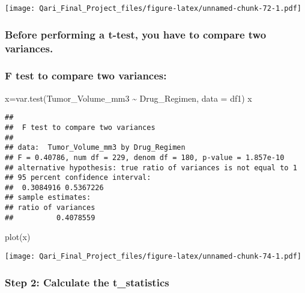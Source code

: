 \documentclass[
]{article}
\newenvironment{Shaded}{\begin{snugshade}}{\end{snugshade}}
\newcommand{\AttributeTok}[1]{\textcolor[rgb]{0.77,0.63,0.00}{#1}}
\newcommand{\FunctionTok}[1]{\textcolor[rgb]{0.00,0.00,0.00}{#1}}
\newcommand{\NormalTok}[1]{#1}
\newcommand{\OtherTok}[1]{\textcolor[rgb]{0.56,0.35,0.01}{#1}}
\newcommand{\SpecialCharTok}[1]{\textcolor[rgb]{0.00,0.00,0.00}{#1}}
\begin{document}
\texttt{[image: Qari\_Final\_Project\_files/figure-latex/unnamed-chunk-72-1.pdf]}

\hypertarget{before-performing-a-t-test-you-have-to-compare-two-variances.}{%
\subsubsection{Before performing a t-test, you have to compare two
variances.}\label{before-performing-a-t-test-you-have-to-compare-two-variances.}}

\hypertarget{f-test-to-compare-two-variances}{%
\subsubsection{F test to compare two
variances:}\label{f-test-to-compare-two-variances}}

\begin{Shaded}
\begin{Highlighting}[]
\NormalTok{x}\OtherTok{=}\FunctionTok{var.test}\NormalTok{(Tumor\_Volume\_mm3 }\SpecialCharTok{\textasciitilde{}}\NormalTok{ Drug\_Regimen, }\AttributeTok{data =}\NormalTok{ df1)}
\NormalTok{x}
\end{Highlighting}
\end{Shaded}

\begin{verbatim}
## 
##  F test to compare two variances
## 
## data:  Tumor_Volume_mm3 by Drug_Regimen
## F = 0.40786, num df = 229, denom df = 180, p-value = 1.857e-10
## alternative hypothesis: true ratio of variances is not equal to 1
## 95 percent confidence interval:
##  0.3084916 0.5367226
## sample estimates:
## ratio of variances 
##          0.4078559
\end{verbatim}

\begin{Shaded}
\begin{Highlighting}[]
\FunctionTok{plot}\NormalTok{(x)}
\end{Highlighting}
\end{Shaded}

\texttt{[image: Qari\_Final\_Project\_files/figure-latex/unnamed-chunk-74-1.pdf]}

\hypertarget{step-2-calculate-the-t_statistics}{%
\subsubsection{Step 2: Calculate the
t\_statistics}\label{step-2-calculate-the-t_statistics}}
\end{document}
